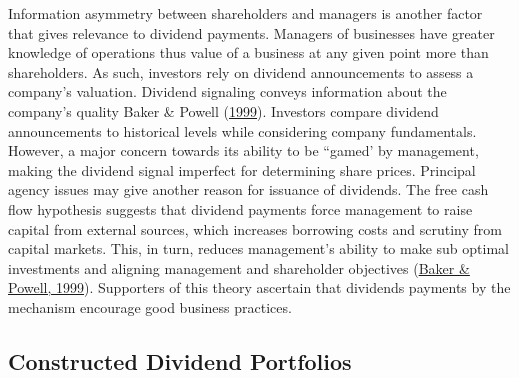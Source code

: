 \documentclass[11pt,preprint, authoryear]{elsarticle}
\numberwithin{equation}{section}
\numberwithin{figure}{section}
\numberwithin{table}{section}
\begin{document}
Information asymmetry between shareholders and managers is another
factor that gives relevance to dividend payments. Managers of businesses
have greater knowledge of operations thus value of a business at any
given point more than shareholders. As such, investors rely on dividend
announcements to assess a company's valuation. Dividend signaling
conveys information about the company's quality Baker \& Powell
(\protect\hyperlink{ref-baker1999corporate}{1999}). Investors compare
dividend announcements to historical levels while considering company
fundamentals. However, a major concern towards its ability to be
``gamed' by management, making the dividend signal imperfect for
determining share prices. Principal agency issues may give another
reason for issuance of dividends. The free cash flow hypothesis suggests
that dividend payments force management to raise capital from external
sources, which increases borrowing costs and scrutiny from capital
markets. This, in turn, reduces management's ability to make sub optimal
investments and aligning management and shareholder objectives
(\protect\hyperlink{ref-baker1999corporate}{Baker \& Powell, 1999}).
Supporters of this theory ascertain that dividends payments by the
mechanism encourage good business practices.

\hypertarget{constructed-dividend-portfolios}{%
\subsection*{Constructed Dividend
Portfolios}\label{constructed-dividend-portfolios}}
\end{document}

